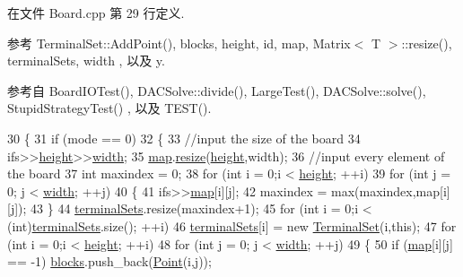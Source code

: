 在文件 Board.\+cpp 第 29 行定义.



参考 Terminal\+Set\+::\+Add\+Point(), blocks, height, id, map, Matrix$<$ T $>$\+::resize(), terminal\+Sets, width , 以及 y.



参考自 Board\+I\+O\+Test(), D\+A\+C\+Solve\+::divide(), Large\+Test(), D\+A\+C\+Solve\+::solve(), Stupid\+Strategy\+Test() , 以及 T\+E\+S\+T().


\begin{DoxyCode}
30 \{
31     \textcolor{keywordflow}{if} (mode == 0)
32     \{
33         \textcolor{comment}{//input the size of the board}
34         ifs>>\hyperlink{classBoard_aa0cb8de0254520dc08dab5796643c8e5}{height}>>\hyperlink{classBoard_a90a8efaa4736af25511ac948bdd27d6c}{width};
35         \hyperlink{classBoard_a191ff45df9151b8fee0c32877f582165}{map}.\hyperlink{classMatrix_a15ce96c8af4c7a982c2c10b96f29cea1}{resize}(\hyperlink{classBoard_aa0cb8de0254520dc08dab5796643c8e5}{height},width);
36         \textcolor{comment}{//input every element of the board}
37         \textcolor{keywordtype}{int} maxindex = 0;
38         \textcolor{keywordflow}{for} (\textcolor{keywordtype}{int} i = 0;i < \hyperlink{classBoard_aa0cb8de0254520dc08dab5796643c8e5}{height}; ++i)
39             \textcolor{keywordflow}{for} (\textcolor{keywordtype}{int} j = 0; j < \hyperlink{classBoard_a90a8efaa4736af25511ac948bdd27d6c}{width}; ++j)
40             \{
41                 ifs>>\hyperlink{classBoard_a191ff45df9151b8fee0c32877f582165}{map}[i][j];
42                 maxindex = max(maxindex,map[i][j]);
43             \}
44     \hyperlink{classBoard_a6683a9c042af7113f55c5bc1b9656b69}{terminalSets}.resize(maxindex+1);
45     \textcolor{keywordflow}{for} (\textcolor{keywordtype}{int} i = 0;i < (int)\hyperlink{classBoard_a6683a9c042af7113f55c5bc1b9656b69}{terminalSets}.size(); ++i)
46         \hyperlink{classBoard_a6683a9c042af7113f55c5bc1b9656b69}{terminalSets}[i] = \textcolor{keyword}{new} \hyperlink{classTerminalSet}{TerminalSet}(i,\textcolor{keyword}{this});
47     \textcolor{keywordflow}{for} (\textcolor{keywordtype}{int} i = 0;i < \hyperlink{classBoard_aa0cb8de0254520dc08dab5796643c8e5}{height}; ++i)
48         \textcolor{keywordflow}{for} (\textcolor{keywordtype}{int} j = 0; j < \hyperlink{classBoard_a90a8efaa4736af25511ac948bdd27d6c}{width}; ++j)
49         \{
50             \textcolor{keywordflow}{if} (\hyperlink{classBoard_a191ff45df9151b8fee0c32877f582165}{map}[i][j] == -1) \hyperlink{classBoard_abd553dee0125b79f672dbfa74f86c52b}{blocks}.push\_back(\hyperlink{classPoint}{Point}(i,j));

\end{DoxyCode}

